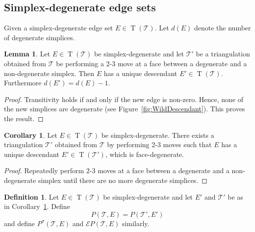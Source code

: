 \documentclass[11pt]{amsart}
\theoremstyle{plain}
\theoremstyle{definition}
\newtheorem{lemma}[theorem]{Lemma}
\newtheorem{definition}[theorem]{Definition}
\newtheorem{corollary}[theorem]{Corollary}
\numberwithin{equation}{section}
\newcommand{\T}{\mathcal T}
\newcommand{\E}{\mathcal E}
\DeclareMathOperator{\TE}{T}
\begin{document}
\subsection{Simplex-degenerate edge sets}
Given a simplex-degenerate edge set $E\in \TE(\T)$. Let $d(E)$ denote the number of degenerate simplices.
\begin{lemma} Let $E\in \TE(\T)$ be simplex-degenerate and let $\T'$ be a triangulation obtained from $\T$ be performing a 2-3 move at a face between a degenerate and a non-degenerate simplex. Then $E$ has a unique descendant $E'\in \TE(\T)$. Furthermore $d(E')=d(E)-1$.
\end{lemma}
\begin{proof}
Transitivity holds if and only if the new edge is non-zero. Hence, none of the new simplices are degenerate (see Figure~\ref{fig:WildDescendant}). This proves the result.
\end{proof}
\begin{corollary}\label{cor:RemoveDegeneracy} Let $E\in \TE(\T)$ be simplex-degenerate. There exists a triangulation $\T'$ obtained from $\T$ by performing 2-3 moves such that $E$ has a unique descendant $E'\in \TE(\T')$, which is face-degenerate.
\end{corollary}
\begin{proof}
Repeatedly perform 2-3 moves at a face between a degenerate and a non-degenerate simplex until there are no more degenerate simplices.
\end{proof}

\begin{definition}\label{def:PtolemyWild} Let $E\in \TE(\T)$ be simplex-degenerate and let $E'$ and $\T'$ be as in Corollary~\ref{cor:RemoveDegeneracy}. Define
\begin{equation}
P(\T,E)=P(\T',E')
\end{equation}
and define $P^\sigma(\T,E)$ and $\E P(\T,E)$ similarly.
\end{definition}
\end{document}

